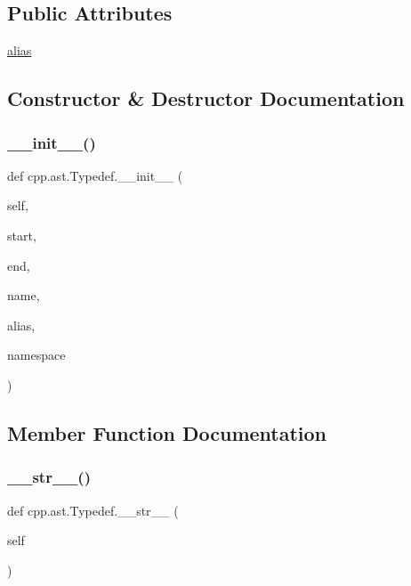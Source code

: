 \subsection*{Public Attributes}
\begin{DoxyCompactItemize}
\item 
\mbox{\hyperlink{classcpp_1_1ast_1_1Typedef_a3187a504dfbefe50b866b44902823c30}{alias}}
\end{DoxyCompactItemize}


\subsection{Constructor \& Destructor Documentation}
\mbox{\label{classcpp_1_1ast_1_1Typedef_af3275d2390190a074de470c1424e05e0}} 
\subsubsection{\texorpdfstring{\_\_init\_\_()}{\_\_init\_\_()}}
{\footnotesize\ttfamily def cpp.\+ast.\+Typedef.\+\_\+\+\_\+init\+\_\+\+\_\+ (\begin{DoxyParamCaption}\item[{}]{self,  }\item[{}]{start,  }\item[{}]{end,  }\item[{}]{name,  }\item[{}]{alias,  }\item[{}]{namespace }\end{DoxyParamCaption})}



\subsection{Member Function Documentation}
\mbox{\label{classcpp_1_1ast_1_1Typedef_a451920900affc5f12e38ab8fbf5e3dea}} 
\subsubsection{\texorpdfstring{\_\_str\_\_()}{\_\_str\_\_()}}
{\footnotesize\ttfamily def cpp.\+ast.\+Typedef.\+\_\+\+\_\+str\+\_\+\+\_\+ (\begin{DoxyParamCaption}\item[{}]{self }\end{DoxyParamCaption})}


